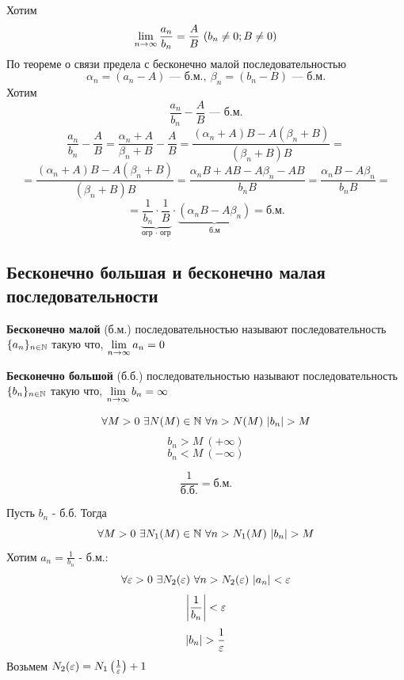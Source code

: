 \begin{Proof}
    Хотим 
    $$\lim\limits_{n \to \infty}\frac{a_n}{b_n} = \frac{A}{B}\ (b_n \neq 0; B \neq 0)$$
    По теореме о связи предела с бесконечно малой последовательностью
    $$ \alpha_n=(a_n - A) \text{ --- б.м.} ,\ \beta_n=(b_n - B) \text{ --- б.м.} $$
    Хотим
    $$ \frac{a_n}{b_n} - \frac{A}{B} \text{ --- б.м.} $$
    $$ \frac{a_n}{b_n} - \frac{A}{B} = \frac{\alpha_n + A}{\beta_n + B} - \frac{A}{B} = \frac{(\alpha_n + A)B - A(\beta_n + B)}{(\beta_n + B)B} = $$
    $$ = \frac{(\alpha_n + A)B - A(\beta_n + B)}{(\beta_n + B)B} = \frac{\alpha_nB + AB - A\beta_n - AB}{b_nB} = \frac{\alpha_nB - A\beta_n}{b_nB} = $$
    $$ = \underbrace{\frac{1}{b_n} \cdot \frac{1}{B}}_{\text{огр $\cdot$ огр}} \cdot \underbrace{(\alpha_nB - A\beta_n)}_{\text{б.м}} = \text{б.м.} $$

\end{Proof}

\subsection{Бесконечно большая и бесконечно малая последовательности}

\begin{definition}
    \textbf{Бесконечно малой} (б.м.) последовательностью называют последовательность $\{a_n\}_{n\in\mathbb{N}}$ такую что, $ \lim\limits_{n \to \infty} a_n = 0 $
\end{definition}

\begin{definition}
    \textbf{Бесконечно большой} (б.б.) последовательностью называют последовательность $\{b_n\}_{n\in\mathbb{N}}$ такую что, $ \lim\limits_{n \to \infty} b_n = \infty $

    $$ \forall M > 0\ \exists N(M) \in \N\ \forall n > N(M)\ |b_n| > M $$
    $$ b_n > M\ (+ \infty) $$
    $$ b_n < M\ (- \infty) $$
\end{definition}

\begin{theorem}
    $$\frac{1}{\text{б.б.}} = \text{б.м.}$$
\end{theorem}

\begin{Proof}
    Пусть $b_n$ - б.б. Тогда
    $$ \forall M > 0\ \exists N_1(M) \in \mathbb{N}\ \forall n > N_1(M)\ |b_n| > M $$
    Хотим $a_n = \frac{1}{b_n}$ - б.м.:
    $$ \forall \varepsilon > 0\ \exists N_2(\varepsilon)\ \forall n > N_2(\varepsilon)\ |a_n| < \varepsilon $$
    $$ \left|\frac{1}{b_n}\right| < \varepsilon $$
    $$ \left|b_n\right| > \frac{1}{\varepsilon} $$
    Возьмем $N_2(\varepsilon) = N_1\left(\frac{1}{\varepsilon}\right) + 1$
\end{Proof}


